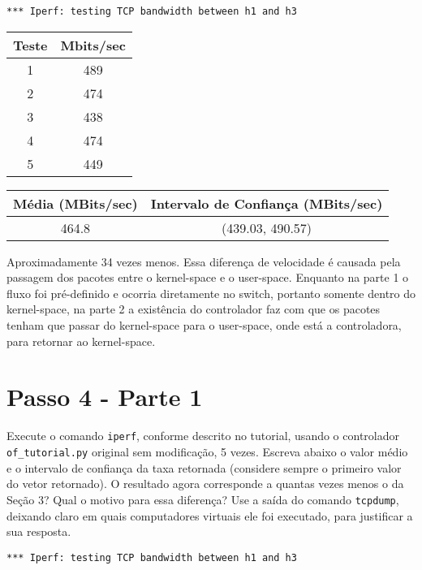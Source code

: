 \documentclass[12pt,letterpaper]{article}
\begin{document}
\begin{verbatim}
*** Iperf: testing TCP bandwidth between h1 and h3
\end{verbatim}

\begin{center}
\begin{tabular}{ |c|c| } 
 \hline
 Teste & Mbits/sec \\
 \hline
 1 & 489 \\ 
 2 & 474 \\ 
 3 & 438 \\ 
 4 & 474 \\ 
 5 & 449 \\ 
 \hline
\end{tabular}
\end{center}

\begin{center}
\begin{tabular}{|c|c|}
 \hline
 Média (MBits/sec) & Intervalo de Confiança (MBits/sec)\\
 \hline
 464.8 & (439.03, 490.57) \\
 \hline
 \end{tabular}
\end{center}

Aproximadamente 34 vezes menos. Essa diferença de velocidade é causada pela passagem dos pacotes entre o kernel-space e o user-space. Enquanto na parte 1 o fluxo foi pré-definido e ocorria diretamente no switch, portanto somente dentro do kernel-space, na parte 2 a existência do controlador faz com que os pacotes tenham que passar do kernel-space para o user-space, onde está a controladora, para retornar ao kernel-space.

\section{Passo 4 - Parte 1}


Execute o comando \texttt{iperf}, conforme descrito no
tutorial, usando o controlador \texttt{of\_tutorial.py} original sem
modificação, 5 vezes. Escreva abaixo o valor médio e o intervalo de
confiança da taxa retornada (considere sempre o primeiro valor do
vetor retornado). O resultado agora
corresponde a quantas vezes menos o da Seção 3? Qual o motivo para
essa diferença? Use a saída do comando \texttt{tcpdump}, deixando
claro em quais computadores virtuais ele foi executado, para
justificar a sua resposta.

\begin{verbatim}
*** Iperf: testing TCP bandwidth between h1 and h3
\end{verbatim}
\end{document}
